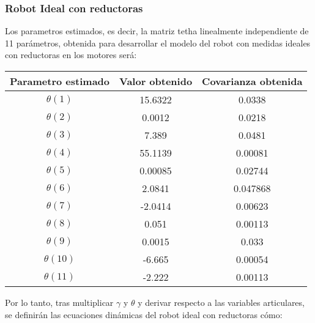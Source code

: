 	\subsubsection{Robot Ideal con reductoras}
	Los parametros estimados, es decir, la matriz tetha linealmente independiente de 11 parámetros, obtenida para desarrollar el modelo del robot con medidas ideales con reductoras en los motores será:
	\begin{center}
		\begin{tabular}{| c | c | c |}

			\hline
			Parametro estimado & Valor obtenido & Covarianza obtenida \\
			\hline
			$\theta(1) $ & 15.6322 & 0.0338 \\
			\hline
			$\theta(2) $ & 0.0012 & 0.0218 \\
			\hline
			$\theta(3) $ & 7.389 & 0.0481 \\
			\hline
			$\theta(4) $ & 55.1139 & 0.00081 \\
			\hline
			$\theta(5) $ & 0.00085 & 0.02744 \\
			\hline
			$\theta(6) $ & 2.0841 & 0.047868 \\
			\hline
			$\theta(7) $ & -2.0414 & 0.00623 \\
			\hline
			$\theta(8) $ & 0.051 & 0.00113 \\
			\hline
			$\theta(9) $ & 0.0015 & 0.033 \\
			\hline
			$\theta(10) $ & -6.665 & 0.00054 \\
			\hline
			$\theta(11) $ & -2.222 & 0.00113 \\
			\hline


		\end{tabular}
	\end{center}
Por lo tanto, tras multiplicar $\gamma$ y $\theta$ y derivar respecto a las variables articulares, se definirán las ecuaciones dinámicas del robot ideal con reductoras cómo:\\


